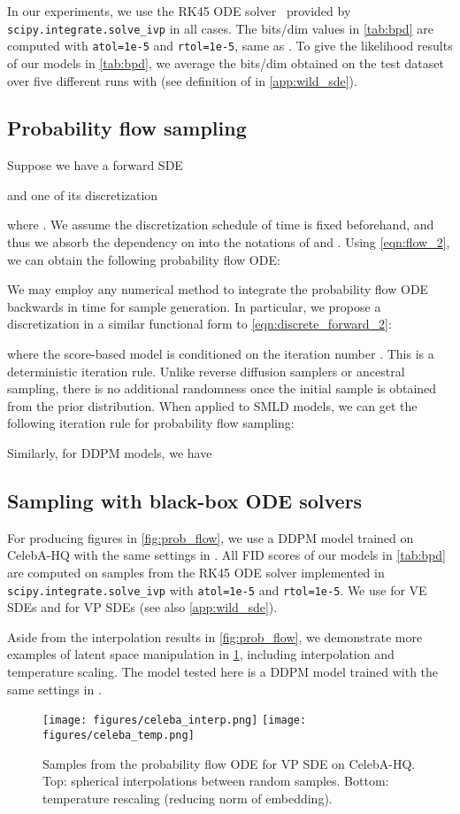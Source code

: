 \documentclass{article} \usepackage{iclr2021_conference,times}
\begin{document}
In our experiments, we use the RK45 ODE solver~\citep{dormand1980family} provided by \verb|scipy.integrate.solve_ivp| in all cases. The bits/dim values in \cref{tab:bpd} are computed with \verb|atol=1e-5| and \verb|rtol=1e-5|, same as \citet{grathwohl2018ffjord}. To give the likelihood results of our models in \cref{tab:bpd}, we average the bits/dim obtained on the test dataset over five different runs with  (see definition of  in \cref{app:wild_sde}).

\subsection{Probability flow sampling}\label{app:prob_flow_sampling}
Suppose we have a forward SDE

and one of its discretization

where . We assume the discretization schedule of time is fixed beforehand, and thus we absorb the dependency on  into the notations of  and . Using \cref{eqn:flow_2}, we can obtain the following probability flow ODE:

We may employ any numerical method to integrate the probability flow ODE backwards in time for sample generation. In particular, we propose a discretization in a similar functional form to \cref{eqn:discrete_forward_2}:

where the score-based model  is conditioned on the iteration number . This is a deterministic iteration rule. Unlike reverse diffusion samplers or ancestral sampling, there is no additional randomness once the initial sample  is obtained from the prior distribution. When applied to SMLD models, we can get the following iteration rule for probability flow sampling:

Similarly, for DDPM models, we have


\subsection{Sampling with black-box ODE solvers}\label{app:flow}
For producing figures in \cref{fig:prob_flow}, we use a DDPM model trained on  CelebA-HQ with the same settings in \citet{ho2020denoising}. All FID scores of our models in \cref{tab:bpd} are computed on samples from the RK45 ODE solver implemented in  \verb|scipy.integrate.solve_ivp| with \verb|atol=1e-5| and \verb|rtol=1e-5|. We use  for VE SDEs and  for VP SDEs (see also \cref{app:wild_sde}). 

Aside from the interpolation results in \cref{fig:prob_flow}, we demonstrate more examples of latent space manipulation in \cref{fig:celeba256}, including interpolation and temperature scaling. The model tested here is a DDPM model trained with the same settings in \citet{ho2020denoising}.
\begin{figure}
    \centering
    \texttt{[image: figures/celeba\_interp.png]}
    \texttt{[image: figures/celeba\_temp.png]}
    \caption{Samples from the probability flow ODE for VP SDE on  CelebA-HQ. Top: spherical interpolations between random samples. Bottom: temperature rescaling (reducing norm of embedding).}
    \label{fig:celeba256}
\end{figure}
\end{document}
